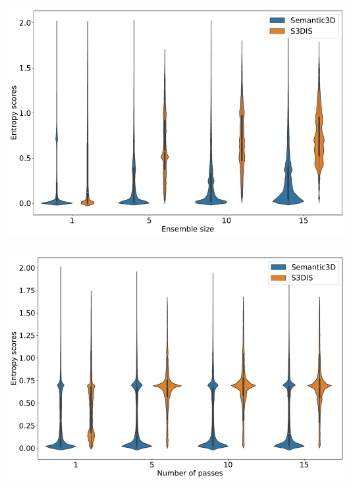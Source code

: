     \begin{figure}[h!]
        \centering
        \begin{subfigure}{0.98\textwidth}
            \includegraphics[width=0.98\textwidth, height=0.48\textheight]{images/violin_in_Entropy_DE_plot.pdf}
        \end{subfigure}
        \begin{subfigure}{0.98\textwidth}
            \includegraphics[width=0.98\textwidth, height=0.48\textheight]{images/violin_in_Entropy_FOUT_plot.pdf}
        \end{subfigure}
    \end{figure}
